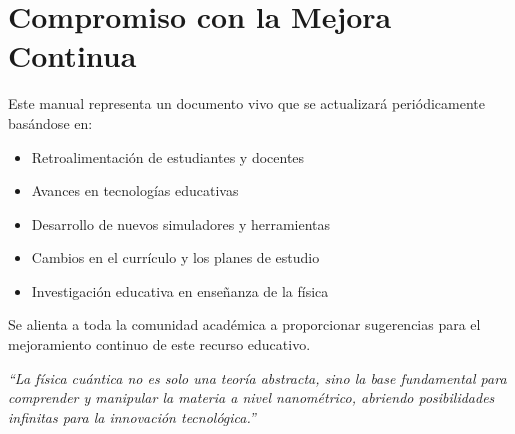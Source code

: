 \documentclass[12pt,a4paper]{book}
\begin{document}
	\section{Compromiso con la Mejora Continua}
	
	Este manual representa un documento vivo que se actualizará periódicamente basándose en:
	
	\begin{itemize}
		\item Retroalimentación de estudiantes y docentes
		\item Avances en tecnologías educativas
		\item Desarrollo de nuevos simuladores y herramientas
		\item Cambios en el currículo y los planes de estudio
		\item Investigación educativa en enseñanza de la física
	\end{itemize}
	
	Se alienta a toda la comunidad académica a proporcionar sugerencias para el mejoramiento continuo de este recurso educativo.
	
	\vfill
	
	\begin{center}
		\textcolor{uteqgray}{\textit{``La física cuántica no es solo una teoría abstracta, sino la base fundamental para comprender y manipular la materia a nivel nanométrico, abriendo posibilidades infinitas para la innovación tecnológica.''}}
	\end{center}
	
\end{document}

